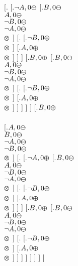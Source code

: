 \documentclass{article}
\begin{document}
[.{} [.{$\neg A, 0\varoplus $} [.{$B, 0\varominus $ \\ $A, 0\varominus $ \\ $\neg B, 0\varominus $ \\ $\neg A, 0\varominus $ \\ $ \varotimes  $}  ] 
[.{} [.{$\neg B, 0\varoplus $ \\ $ \varotimes  $}  ] 
[.{$A, 0\varoplus $ \\ $ \varotimes  $}  ]  ]  ] 
[.{$B, 0\varoplus $} [.{$B, 0\varominus $ \\ $A, 0\varominus $ \\ $\neg B, 0\varominus $ \\ $\neg A, 0\varominus $ \\ $ \varotimes  $}  ] 
[.{} [.{$\neg B, 0\varoplus $ \\ $ \varotimes  $}  ] 
[.{$A, 0\varoplus $ \\ $ \varotimes  $}  ]  ]  ]  ]  ] 
[.{$B, 0\varoplus $ \\  \\ } [.{$A, 0\varominus $ \\ $B, 0\varominus $ \\ $\neg A, 0\varominus $ \\ $\neg B, 0\varominus $ \\ $ \varotimes  $}  ] 
[.{} [.{$\neg A, 0\varoplus $} [.{$B, 0\varominus $ \\ $A, 0\varominus $ \\ $\neg B, 0\varominus $ \\ $\neg A, 0\varominus $ \\ $ \varotimes  $}  ] 
[.{} [.{$\neg B, 0\varoplus $ \\ $ \varotimes  $}  ] 
[.{$A, 0\varoplus $ \\ $ \varotimes  $}  ]  ]  ] 
[.{$B, 0\varoplus $} [.{$B, 0\varominus $ \\ $A, 0\varominus $ \\ $\neg B, 0\varominus $ \\ $\neg A, 0\varominus $ \\ $ \varotimes  $}  ] 
[.{} [.{$\neg B, 0\varoplus $ \\ $ \varotimes  $}  ] 
[.{$A, 0\varoplus $ \\ $ \varotimes  $}  ]  ]  ]  ]  ]  ]  ]  ]


 
\end{document}
